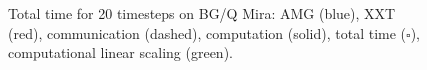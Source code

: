 \documentclass{sig-alternate}
\begin{document}
\begin{figure}
{  }
  \caption{Total time for 20 timesteps on BG/Q Mira: AMG ({\color{blue}blue}), XXT ({\color{red}red}), communication (dashed),
  computation (solid), total time ($\square$), computational linear scaling
  ({\color{green}green}).}
  \label{fig:scaling_mira}
\end{figure}
\end{document}
